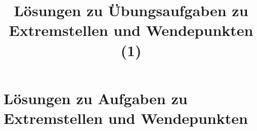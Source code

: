 \documentclass[10pt,a4paper]{article}
\begin{document}
	
\title{Lösungen zu Übungsaufgaben zu Extremstellen und Wendepunkten (1)}

\makeatletter
\def\@maketitle{%
  \newpage
  \null
  \vskip 2em%
  \begin{center}%
	\let \footnote \thanks
    {\Huge\bfseries\@title \par}%
    \vskip 1.5em%
    {\large
	\lineskip .5em%
	\begin{tabular}[t]{c}%
        \@author
      \end{tabular}\par}%
    \vskip 1em%
    {\large \@date}%
  \end{center}%
  \par
  \vskip 1.5em}
\makeatother

\author{}
\date{}

\maketitle

\section*{Lösungen zu Aufgaben zu Extremstellen und Wendepunkten}
\end{document}
